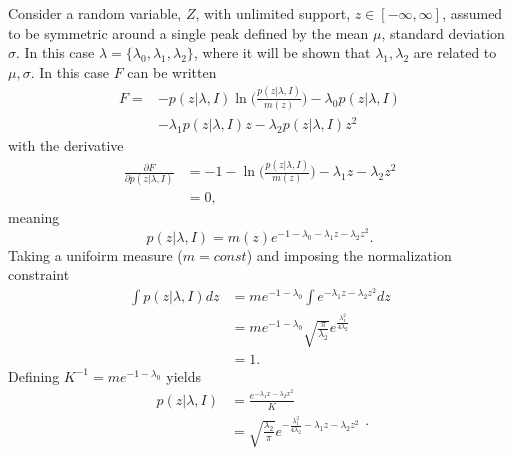 	\begin{example}
		Consider a random variable, $Z$, with unlimited support, $z\in [-\infty,\infty]$, assumed to be symmetric around a single peak defined by the mean $\mu$, standard deviation $\sigma$. In this case $\lambda = \{\lambda_0,\lambda_1,\lambda_2\}$, where it will be shown that $\lambda_1,\lambda_2$ are related to $\mu,\sigma$. In this case $F$ can be written\label{ex:gauss}
		\begin{equation}
			\begin{split}
				F =& -p(z|\lambda,I)\ln\bigg(\frac{p(z|\lambda,I)}{m(z)}\bigg)-\lambda_0p(z|\lambda,I)\\
				&-\lambda_1p(z|\lambda,I)z-\lambda_2p(z|\lambda,I)z^2
			\end{split}
		\end{equation}
		with the derivative
		\begin{equation}
			\begin{split}
				\frac{\partial F}{\partial p(z|\lambda,I)} &= -1-\ln\bigg(\frac{p(z|\lambda,I)}{m(z)}\bigg)-\lambda_1z-\lambda_2z^2\\
				&=0,
			\end{split}
		\end{equation}
		meaning
		\begin{equation}
			p(z|\lambda,I)=m(z)e^{-1-\lambda_0-\lambda_1z-\lambda_2z^2}.
		\end{equation}
		Taking a unifoirm measure ($m= const$) and imposing the normalization constraint
		\begin{equation}
			\begin{split}
				\int p(z|\lambda,I) dz &= me^{-1-\lambda_0}\int e^{-\lambda_1z-\lambda_2z^2}dz\\
				&= me^{-1-\lambda_0}\sqrt{\frac{\pi}{\lambda_2}}e^{\frac{\lambda_1^2}{4\lambda_2}}\\
				&=1.
			\end{split}
		\end{equation}
		Defining $K^{-1} = me^{-1-\lambda_0}$ yields
		\begin{equation}
			\begin{split}
				p(z|\lambda,I) &= \frac{e^{-\lambda_1x-\lambda_2x^2}}{K}\\
				&= \sqrt{\frac{\lambda_2}{\pi}}e^{-\frac{\lambda_1^2}{4\lambda_2}-\lambda_1z-\lambda_2z^2}\\
			\end{split}.
		\end{equation}

\end{example}
